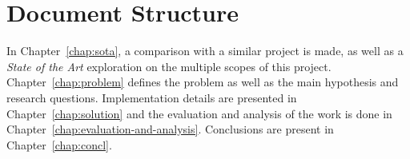 \section{Document Structure}

In Chapter~\ref{chap:sota}, a comparison with a similar project is made, as well as a \textit{State of the Art} exploration on the multiple scopes of this project. Chapter~\ref{chap:problem} defines the problem as well as the main hypothesis and research questions. Implementation details are presented in Chapter~\ref{chap:solution} and the evaluation and analysis of the work is done in Chapter~\ref{chap:evaluation-and-analysis}. Conclusions are present in Chapter~\ref{chap:concl}. 